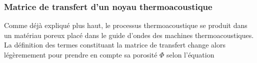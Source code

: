 %
%

\subsubsection{Matrice de transfert d'un noyau thermoacoustique}

Comme déjà expliqué plus haut, le processus thermoacoustique se produit dans un matériau poreux placé dans le guide d'ondes des machines thermoacoustiques. La définition des termes constituant la matrice de transfert change alors légèremement pour prendre en compte sa porosité $\Phi$ selon l'équation

